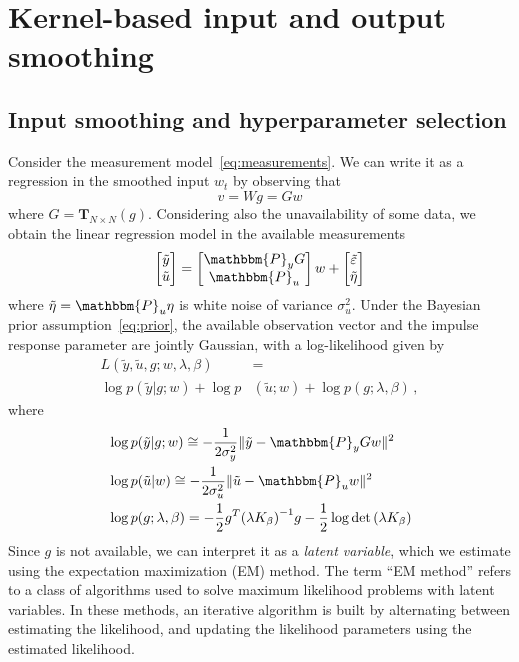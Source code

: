 \documentclass[10pt]{article}
\renewcommand{\P}{\mathbbm{P}}
\newcommand{\T}{\mathbf{T}}
\newcommand{\rmatrix}[1]{\begin{bmatrix}#1\end{bmatrix}}
\begin{document}
\section{Kernel-based input and output smoothing}\label{sec:ml}
\subsection*{Input smoothing and hyperparameter selection}
Consider the measurement model~\eqref{eq:measurements}. We can write it as a
regression in the smoothed input $w_t$ by observing that
\begin{equation}
  v = Wg = Gw
\end{equation}
where $G = \T_{N\times N}(g)$. Considering also the unavailability of some
data, we obtain the linear regression model in the available measurements
\begin{equation}
  \rmatrix{\tilde y \\ \tilde u }= \rmatrix{\P_y G\\ \P_u }  w +
  \rmatrix{\tilde \varepsilon\\ \tilde \eta}
\end{equation}
where $\tilde \eta = \P_u\eta$ is white noise of variance $\sigma_u^2$.
Under the Bayesian prior assumption~\eqref{eq:prior}, the available observation
vector and the impulse response parameter are jointly Gaussian, with a
log-likelihood given by
\begin{equation}\label{eq:complete_likelihood}
  \begin{split}
  L(\tilde y,\tilde u,g;w,\lambda,\beta) &= \\
  \log p(\tilde y|g;w) + \log p&(\tilde u;w) + \log p(g;\lambda,\beta) \,,
  \end{split}
\end{equation}
where
\begin{equation}
  \begin{split}
    & \log p(\tilde y|g;w) \cong -\frac{1}{2\sigma_y^2}\|\tilde y -\P_y Gw\|^2\\
    & \log p(\tilde u|w) \cong -\frac{1}{2\sigma_u^2}\|\tilde u - \P_u w\|^2\\
    & \log p(g;\lambda,\beta) =  -\frac{1}{2}g^T{(\lambda K_\beta)}^{-1}g -
    \frac{1}{2}\log\det\left( \lambda K_\beta \right)
  \end{split}
\end{equation}
Since $g$ is not available, we can interpret it as a \emph{latent variable},
which we estimate using the expectation maximization (EM) method.  The term
``EM method'' refers to a class of algorithms used to solve maximum likelihood
problems with latent variables.  In these methods, an iterative algorithm is
built by alternating between estimating the likelihood, and
updating the likelihood parameters using the estimated likelihood.
\end{document}
